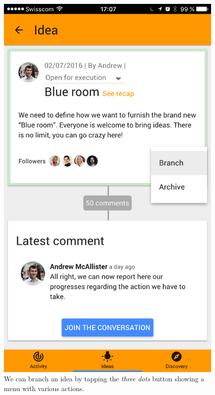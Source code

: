 \documentclass[a4paper,12pt,twoside]{article}
\begin{document}
\begin{figure}[!htb]
\begin{minipage}[t]{.32\textwidth}
        \includegraphics[width=\textwidth]{images/flow_branch_1alt.png}
        \caption{We can branch an idea by tapping the \emph{three dots} button showing a menu with various actions.}
    \end{minipage}
    \hfill
    \begin{minipage}[t]{.32\textwidth}
        \centering

\end{minipage}
\end{figure}
\end{document}
